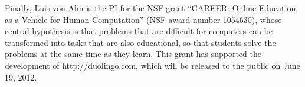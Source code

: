 \documentclass[12pt]{article}
\begin{document}
Finally, Luis von Ahn is the PI for the NSF grant ``CAREER: Online 
Education as a Vehicle for Human Computation'' (NSF award number 
1054630), whose central hypothesis is that problems that are difficult 
for computers can be transformed into tasks that are also educational, 
so that students solve the problems at the same time as they learn.
This grant has supported the development of http://duolingo.com, which
will be released to the public on June 19, 2012.

\newpage
\setcounter{page}{1}


\end{document}
